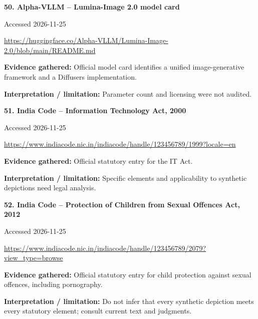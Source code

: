 \documentclass[11pt,a4paper]{article}
\begin{document}
\noindent\begin{minipage}{\linewidth}\textbf{50. Alpha-VLLM -- Lumina-Image 2.0 model card}\par{\small Accessed 2026-11-25\par\url{https://huggingface.co/Alpha-VLLM/Lumina-Image-2.0/blob/main/README.md}}\par
\textbf{Evidence gathered:} Official model card identifies a unified image-generative framework and a Diffusers implementation.\par\textbf{Interpretation / limitation:} Parameter count and licensing were not audited.\par
\end{minipage}\par\vspace{2mm}
\noindent\begin{minipage}{\linewidth}\textbf{51. India Code -- Information Technology Act, 2000}\par{\small Accessed 2026-11-25\par\url{https://www.indiacode.nic.in/indiacode/handle/123456789/1999?locale=en}}\par
\textbf{Evidence gathered:} Official statutory entry for the IT Act.\par\textbf{Interpretation / limitation:} Specific elements and applicability to synthetic depictions need legal analysis.\par
\end{minipage}\par\vspace{2mm}
\noindent\begin{minipage}{\linewidth}\textbf{52. India Code -- Protection of Children from Sexual Offences Act, 2012}\par{\small Accessed 2026-11-25\par\url{https://www.indiacode.nic.in/indiacode/handle/123456789/2079?view_type=browse}}\par
\textbf{Evidence gathered:} Official statutory entry for child protection against sexual offences, including pornography.\par\textbf{Interpretation / limitation:} Do not infer that every synthetic depiction meets every statutory element; consult current text and judgments.\par
\end{minipage}\par\vspace{2mm}
\end{document}
